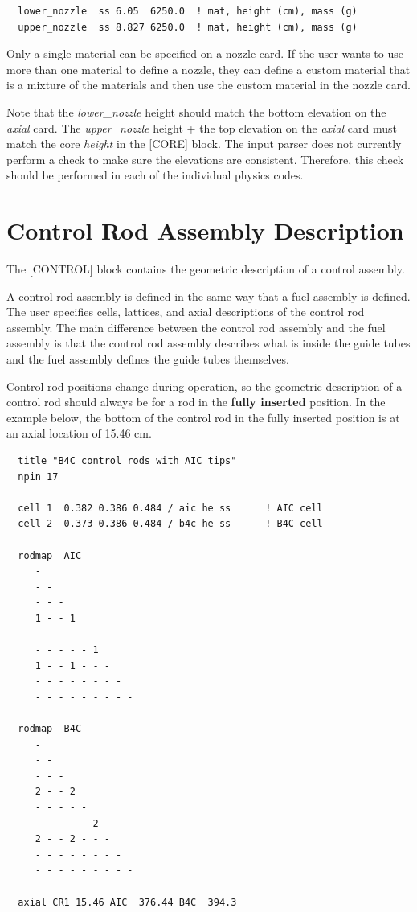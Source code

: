 \begin{verbatim}
  lower_nozzle  ss 6.05  6250.0  ! mat, height (cm), mass (g)
  upper_nozzle  ss 8.827 6250.0  ! mat, height (cm), mass (g)
\end{verbatim}

Only a single material can be specified on a nozzle card.  If the user wants to use
more than one material to define a nozzle, they can define a custom material that
is a mixture of the materials and then use the custom material in the nozzle card.

Note that the {\it lower\_nozzle} height should match the bottom elevation on the {\it axial} card.
The {\it upper\_nozzle} height + the top elevation on the {\it axial} card must match the
core {\it height} in the [CORE] block.
The input parser does not currently perform a check to make sure the elevations are consistent.
Therefore, this check should be performed in each of the individual physics codes.

\section{Control Rod Assembly Description}

The [CONTROL] block contains the geometric description of a control assembly.

A control rod assembly is defined in the same way that a fuel assembly is defined.
The user specifies cells, lattices, and axial descriptions of the control rod assembly. 
The main difference between the control rod assembly and the fuel assembly is that
the control rod assembly describes what is inside the guide tubes and the fuel assembly
defines the guide tubes themselves.

Control rod positions change during operation, so the geometric description of a control rod
should always be for a rod in the {\bf fully inserted} position.
In the example below, the bottom of the control rod in the fully inserted position is 
at an axial location of 15.46 cm.

\begin{verbatim}
  title "B4C control rods with AIC tips" 
  npin 17

  cell 1  0.382 0.386 0.484 / aic he ss      ! AIC cell
  cell 2  0.373 0.386 0.484 / b4c he ss      ! B4C cell

  rodmap  AIC
     -
     - -
     - - -
     1 - - 1
     - - - - -
     - - - - - 1
     1 - - 1 - - -
     - - - - - - - -
     - - - - - - - - -

  rodmap  B4C
     -
     - -
     - - -
     2 - - 2
     - - - - -
     - - - - - 2
     2 - - 2 - - -
     - - - - - - - -
     - - - - - - - - -

  axial CR1 15.46 AIC  376.44 B4C  394.3
\end{verbatim}

